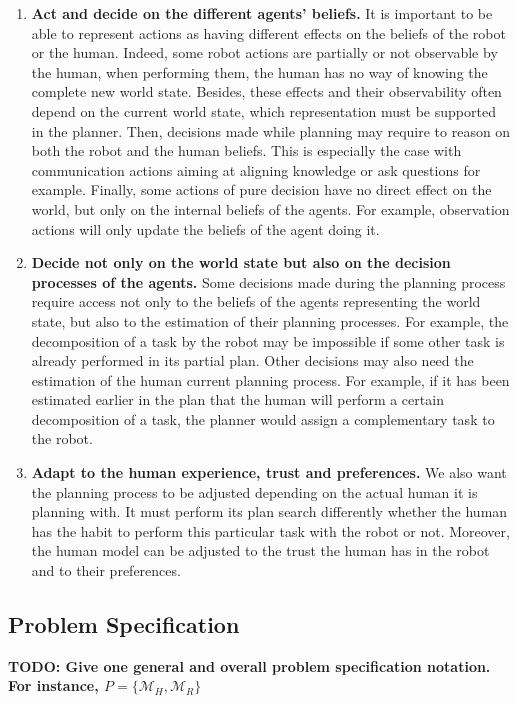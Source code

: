 \begin{enumerate}
    \item \textbf{Act and decide on the different agents' beliefs.} It is important to be able to represent actions as having different effects on the beliefs of the robot or the human. Indeed, some robot actions are partially or not observable by the human, when performing them, the human has no way of knowing the complete new world state. Besides, these effects and their observability often depend on the current world state, which representation must be supported in the planner. Then, decisions made while planning may require to reason on both the robot and the human beliefs. This is especially the case with communication actions aiming at aligning knowledge or ask questions for example. Finally, some actions of pure decision have no direct effect on the world, but only on the internal beliefs of the agents. For example, observation actions will only update the beliefs of the agent doing it.

    \item \textbf{Decide not only on the world state but also on the decision processes of the agents.} Some decisions made during the planning process require access not only to the beliefs of the agents representing the world state, but also to the estimation of their planning processes. For example, the decomposition of a task by the robot may be impossible if some other task is already performed in its partial plan. Other decisions may also need the estimation of the human current planning process. For example, if it has been estimated earlier in the plan that the human will perform a certain decomposition of a task, the planner would assign a complementary task to the robot.

    \item \textbf{Adapt to the human experience, trust and preferences.} We also want the planning process to be adjusted depending on the actual human it is planning with. It must perform its plan search differently whether the human has the habit to perform this particular task with the robot or not. Moreover, the human model can be adjusted to the trust the human has in the robot and to their preferences.

\end{enumerate}

\subsection{Problem Specification}

\textbf{TODO: Give one general and overall problem specification notation. For instance, $P = \{ \mathcal{M}_H, \mathcal{M}_R \}$}

